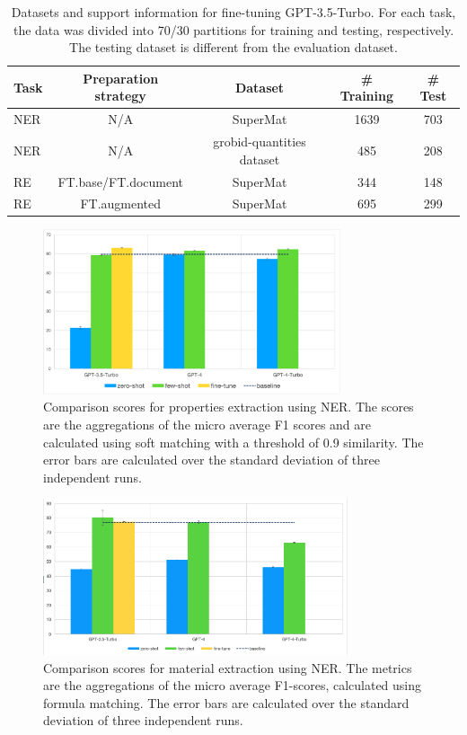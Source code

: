 \begin{table}[htbp]
    \centering
    \caption{Datasets and support information for fine-tuning GPT-3.5-Turbo. For each task, the data was divided into 70/30 partitions for training and testing, respectively. The testing dataset is different from the evaluation dataset.  }
    \label{tab:amount-data-fine-tuned}
    \begin{tabular}{lcccc}
        \textbf{Task} & \textbf{Preparation strategy} & \textbf{Dataset} & \textbf{\# Training} & \textbf{\# Test} \\
        \toprule
        NER & N/A & SuperMat   & 1639 & 703 \\
        NER & N/A & grobid-quantities dataset & 485 & 208 \\
        RE  & FT.base/FT.document & SuperMat   & 344 & 148 \\
        RE  & FT.augmented & SuperMat & 695 & 299 \\
        \bottomrule
    \end{tabular}
\end{table}

\begin{figure}[htbp]
  \centering
  \includegraphics[width=0.78\textwidth]{figures/ner-measeval-all} 
  \caption{Comparison scores for properties extraction using NER. The scores are the aggregations of the micro average F1 scores and are calculated using soft matching with a threshold of 0.9 similarity. The error bars are calculated over the standard deviation of three independent runs.}
  \label{fig:ner-measeval-all}
\end{figure}

\begin{figure}[htbp]
  \centering
  \includegraphics[width=0.8\textwidth]{figures/ner-supermat-all} 
  \caption{Comparison scores for material extraction using NER. The metrics are the aggregations of the micro average F1-scores, calculated using formula matching. The error bars are calculated over the standard deviation of three independent runs.}
  \label{fig:ner-materials-all}
\end{figure}

